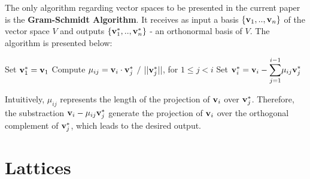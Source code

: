 \begin{enumerate}
	The only algorithm regarding vector spaces to be presented in the current paper is the  \textbf{Gram-Schmidt Algorithm}. It receives as input a basis $\{\textbf{v}_1, .., \textbf{v}_n\}$ of the vector space $V$ and outputs $\{\textbf{v}_1^*,..,\textbf{v}_n^*\}$ - an orthonormal basis of $V$. The algorithm is presented below:

\begin{tcolorbox}[colframe=black,colback=white,arc=0pt,outer arc=0pt]
	\begin{algorithmic}[1]
		\State Set $\textbf{v}_1^* = \textbf{v}_1$
		\State Compute $\mu_{ij} = \textbf{v}_i \cdot \textbf{v}_j^*$ $/$ $ ||\textbf{v}_j^*||$,  for $1 \leq j < i$
		\State Set $\textbf{v}_i^* = \textbf{v}_i - \displaystyle{\sum_{j = 1}^{i-1}} \mu_{ij} \textbf{v}_j^* $
		\EndFor
	\end{algorithmic}
\end{tcolorbox}

	Intuitively, $\mu_{ij}$ represents the length of the projection of $\textbf{v}_i$ over $\textbf{v}_j^*$. Therefore, the substraction $\textbf{v}_i - \mu_{ij} \textbf{v}_j^*$ generate the projection of $\textbf{v}_i$ over the orthogonal complement of $\textbf{v}_j^*$, which leads to the desired output. 
\end{enumerate}	

\section{Lattices}

